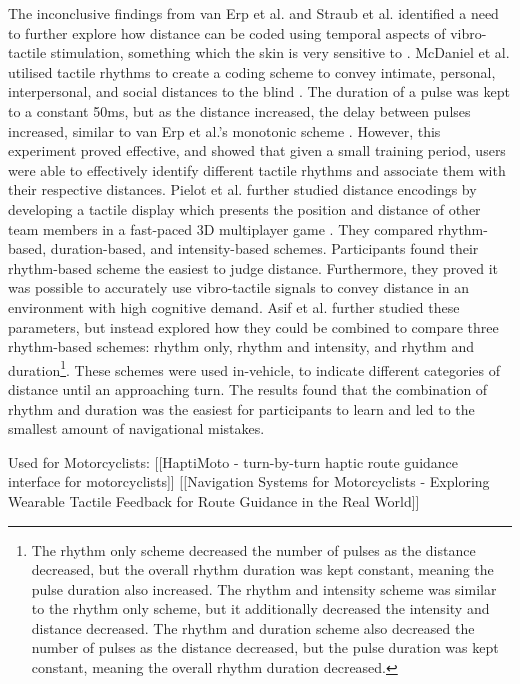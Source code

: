 \documentclass{interim}
\begin{document}
The inconclusive findings from van Erp et al. \cite{10.1145/1060581.1060585} and Straub et al. \cite{5326374} identified a need to further explore how distance can be coded using temporal aspects of vibro-tactile stimulation, something which the skin is very sensitive to \cite{doi:10.1068/p5014}. McDaniel et al. utilised tactile rhythms to create a coding scheme to convey intimate, personal, interpersonal, and social distances to the blind \cite{10.1145/1520340.1520718}. The duration of a pulse was kept to a constant 50ms, but as the distance increased, the delay between pulses increased, similar to van Erp et al.'s monotonic scheme \cite{10.1145/1060581.1060585}. However, this experiment proved effective, and showed that given a small training period, users were able to effectively identify different tactile rhythms and associate them with their respective distances. Pielot et al. further studied distance encodings by developing a tactile display which presents the position and distance of other team members in a fast-paced 3D multiplayer game \cite{10.1145/1753326.1753581}. They compared rhythm-based, duration-based, and intensity-based schemes. Participants found their rhythm-based scheme the easiest to judge distance. Furthermore, they proved it was possible to accurately use vibro-tactile signals to convey distance in an environment with high cognitive demand. Asif et al. \cite{10.1145/1868914.1868923} further studied these parameters, but instead explored how they could be combined to compare three rhythm-based schemes: rhythm only, rhythm and intensity, and rhythm and duration\footnote{The rhythm only scheme decreased the number of pulses as the distance decreased, but the overall rhythm duration was kept constant, meaning the pulse duration also increased. The rhythm and intensity scheme was similar to the rhythm only scheme, but it additionally decreased the intensity and distance decreased. The rhythm and duration scheme also decreased the number of pulses as the distance decreased, but the pulse duration was kept constant, meaning the overall rhythm duration decreased.}. These schemes were used in-vehicle, to indicate different categories of distance until an approaching turn. The results found that the combination of rhythm and duration was the easiest for participants to learn and led to the smallest amount of navigational mistakes.

Used for Motorcyclists:
[[HaptiMoto - turn-by-turn haptic route guidance interface for motorcyclists]]
[[Navigation Systems for Motorcyclists - Exploring Wearable Tactile Feedback for Route Guidance in the Real World]]
\end{document}
